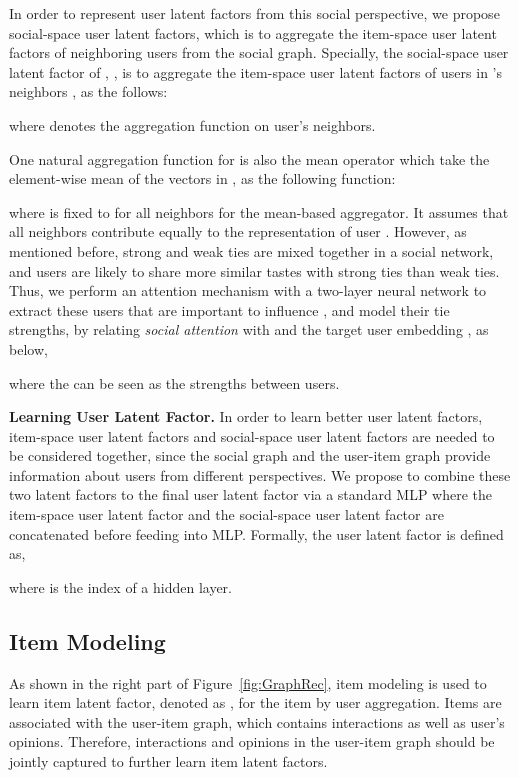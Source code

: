 \documentclass[sigconf]{acmart} \copyrightyear{2019}
\begin{document}
In order to represent user latent factors from this social perspective, we propose social-space user latent factors, which is to aggregate the item-space user latent factors of neighboring users from the social graph. Specially, the social-space user latent factor of , , is to aggregate the item-space user latent factors of users in 's neighbors , as the follows:

where  denotes the aggregation function on user's neighbors.

One natural aggregation function for  is also the mean operator which take the element-wise mean of the vectors in , as the following function:

where  is fixed to  for all neighbors for the mean-based aggregator. It assumes that all neighbors contribute equally to the representation of user . However, as mentioned before, strong and weak ties are mixed together in a social network, and users are likely to share more similar tastes with strong ties than weak ties. Thus, we perform an attention mechanism with a two-layer neural network to extract these users that are important to influence , and model their tie strengths, by relating \emph{social attention}  with  and the target user embedding , as below,

\noindent where the   can be seen as the strengths between users.

{\bf Learning User Latent Factor.} In order to learn better user latent factors, item-space user latent factors and social-space user latent factors are needed to be considered together, since the social graph and the user-item graph provide information about users from different perspectives. We propose to combine these two latent factors to the final user latent factor via a standard MLP where the item-space user latent factor  and the social-space user latent factor  are concatenated before feeding into MLP. Formally, the user latent factor  is defined as,

where  is the index of a hidden layer. 

\subsection{Item Modeling}

As shown in the right part of Figure~\ref{fig:GraphRec}, item modeling is used to learn item latent factor, denoted as , for the item  by user aggregation. Items are associated with the user-item graph, which contains interactions as well as user's opinions. Therefore, interactions and opinions in the user-item graph should be jointly captured to further learn item latent factors.
\end{document}
